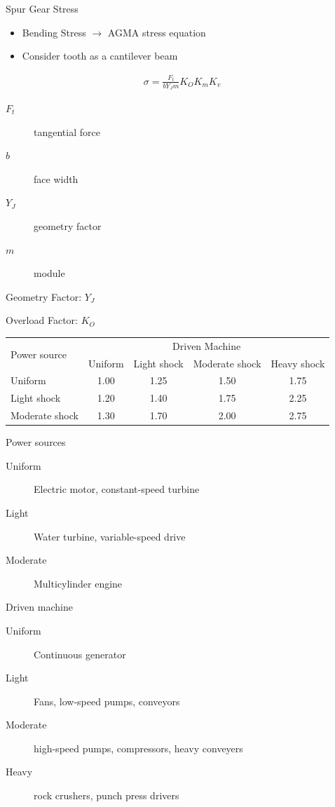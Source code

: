 \documentclass[
10pt,
a4paper,
openany,
svgnames,
]{book}
\begin{document}
\begin{frame}{Spur Gear Stress}
  \begin{itemize}
    \item Bending Stress $\rightarrow$ AGMA stress equation
    \item Consider tooth as a cantilever beam
  \end{itemize}
  \begin{align*}
    \sigma = \frac{F_{t}}{bY_{J}m} K_{O} K_{m} K_{v}
  \end{align*}
  \begin{description}
    \item[$F_{t}$] tangential force
    \item[$b$] face width
    \item[$Y_{J}$] geometry factor
    \item[$m$] module
  \end{description}
\end{frame}

\begin{frame}{Geometry Factor: $Y_{J}$}
  \begin{figure}[htbp]
    \centering
  \end{figure}
\end{frame}

Overload Factor: $K_{O}$
  \begin{table}[htbp]
    \centering
    \begin{tabular}{lcccc}
      \toprule
      \multirow{2}{3cm}{Power source} & \multicolumn{4}{c}{Driven Machine} \\
      & Uniform & Light shock & Moderate shock & Heavy shock \\
      \midrule
      Uniform & 1.00 & 1.25 & 1.50 & 1.75 \\
      Light shock & 1.20 & 1.40 & 1.75 & 2.25 \\
      Moderate shock & 1.30 & 1.70 & 2.00 & 2.75 \\
      \bottomrule
    \end{tabular}
  \end{table}
      Power sources
      \begin{description}
        \item[Uniform] Electric motor, constant-speed turbine
        \item[Light] Water turbine, variable-speed drive
        \item[Moderate] Multicylinder engine
      \end{description}
      Driven machine
      \begin{description}
        \item[Uniform] Continuous generator
        \item[Light] Fans, low-speed pumps, conveyors
        \item[Moderate] high-speed pumps, compressors, heavy conveyers
        \item[Heavy] rock crushers, punch press drivers
      \end{description}
\end{document}
